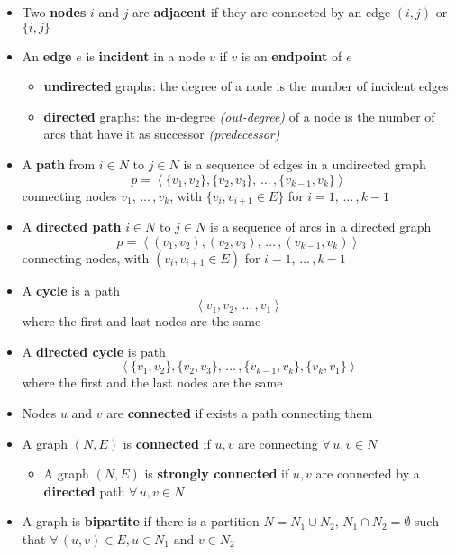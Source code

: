 \documentclass[english]{article}
\begin{document}
\begin{itemize}
  \item Two \textbf{nodes} \(i\) and \(j\) are \textbf{adjacent} if they are connected by an edge \((i, j)\) or \(\{i, j\}\)
  \item An \textbf{edge} \(e\) is \textbf{incident} in a node \(v\) if \(v\) is an \textbf{endpoint} of \(e\)
        \begin{itemize}
          \item \textbf{undirected} graphs: the degree of a node is the number of incident edges
          \item \textbf{directed} graphs: the in-degree \textit{(out-degree)} of a node is the number of arcs that have it as successor \textit{(predecessor)}
        \end{itemize}
  \item A \textbf{path} from \(i \in N \text{ to } j \in N\) is a sequence of edges in a undirected graph
        \[ p = \left\langle \{v_1, v_2\}, \{v_2, v_3\}, \, \ldots \,, \{v_{k-1}, v_k\}\right\rangle \]
        connecting nodes \(v_1, \, \ldots \,, v_k\), with \(\{v_i, v_{i+1} \in E\}\) for \(i = 1, \, \ldots \,, k-1\)
  \item A \textbf{directed path} \(i \in N \text{ to } j \in N\) is a sequence of arcs in a directed graph
        \[ p = \left\langle (v_1, v_2), (v_2, v_3), \, \ldots \,, (v_{k-1}, v_k)\right\rangle \]
        connecting nodes, with  \((v_i, v_{i+1} \in E)\)  for \(i = 1, \, \ldots \,, k-1\)
  \item A \textbf{cycle} is a path \[ \left\langle v_1, v_2, \, \ldots \,, v_1 \right\rangle \] where the first and last nodes are the same
  \item A \textbf{directed cycle} is path \[ \left\langle \{v_1, v_2\}, \{v_2, v_3\}, \, \ldots \,, \{v_{k-1}, v_k\}, \{v_k, v_1\}\right\rangle \]
        where the first and the last nodes are the same
  \item Nodes \(u\) and \(v\) are \textbf{connected} if exists a path connecting them
  \item A graph \((N, E)\) is \textbf{connected} if \(u, v\) are connecting \(\forall \, u, v \in N\)
        \begin{itemize}
          \item A graph \((N, E)\) is \textbf{strongly connected} if \(u, v\) are connected by a \textbf{directed} path \(\forall \, u, v \in N\)
        \end{itemize}
  \item A graph is \textbf{bipartite} if there is a partition \(N = N_1 \cup N_2, \, N_1 \cap N_2 = \emptyset\) such that \(\forall \, (u, v) \in E, u \in N_1 \text{ and } v \in N_2\)

\end{itemize}
\end{document}
